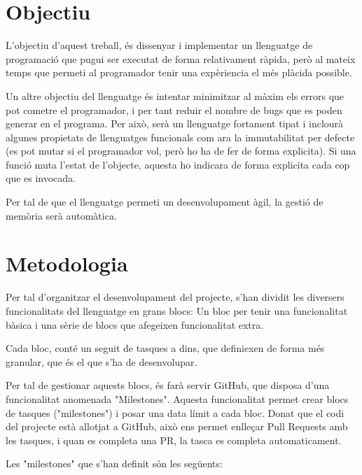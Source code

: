 ﻿\documentclass{article}
\begin{document}
\section{Objectiu}
L'objectiu d'aquest treball, és dissenyar i implementar un llenguatge de 
programació que pugui ser executat de forma relativament ràpida, però al mateix 
temps que permeti al programador tenir una expèriencia el més plàcida possible.

Un altre objectiu del llenguatge és intentar minimitzar al màxim els errors que
pot cometre el programador, i per tant reduir el nombre de bugs que es poden
generar en el programa. Per això, serà un llenguatge fortament tipat i inclourà
algunes propietats de llenguatges funcionals com ara la immutabilitat per 
defecte (es pot mutar si el programador vol, però ho ha de fer de forma 
explicita). Si una funció muta l'estat de l'objecte, aquesta ho indicara de 
forma explicita cada cop que es invocada.

Per tal de que el llenguatge permeti un desenvolupament àgil, la gestió de 
memòria serà automàtica.



\section{Metodologia}
Per tal d'organitzar el desenvolupament del projecte, s'han dividit les 
diversers funcionalitats del llenguatge en grans blocs: Un bloc per tenir una 
funcionalitat bàsica i una sèrie de blocs que afegeixen funcionalitat extra.

Cada bloc, conté un seguit de tasques a dins, que definiexen de forma
més granular, que és el que s'ha de desenvolupar.

Per tal de gestionar aquests blocs, és farà servir GitHub, que disposa d'una 
funcionalitat anomenada "Milestones". Aquesta funcionalitat permet crear blocs
de tasques ("milestones")  i posar una data límit a cada bloc. Donat que el 
codi del projecte està allotjat a GitHub, això ens permet enlleçar Pull Requests
amb les tasques, i quan es completa una PR, la tasca es completa automaticament.

Les "milestones" que s'han definit són les següents:
\end{document}
